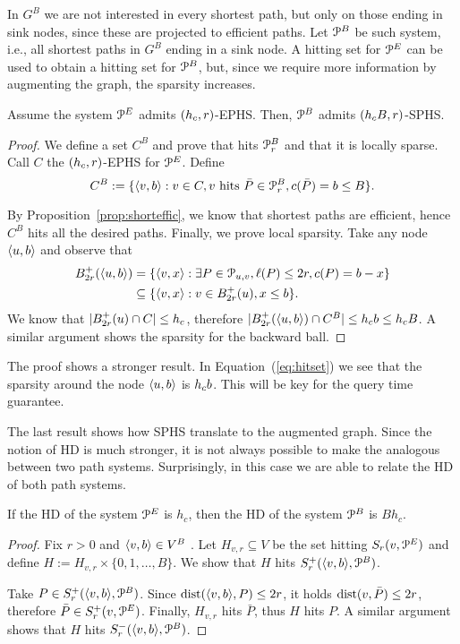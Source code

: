 In $G^B$ we are not interested in every shortest path, but only on those ending in sink nodes, since these are projected to efficient paths. 
Let $\mathcal{P}^B$ be such system, i.e., all shortest paths in $G^B$ ending in a sink node.
A hitting set for $\mathcal{P}^E$ can be used to obtain a hitting set for $\mathcal{P}^B$, but, since we require more information by augmenting the graph, the sparsity increases.
 
\begin{proposition}
Assume the system $\mathcal{P}^E$ admits $(h_c,r)$-EPHS.
Then, $\mathcal{P}^B$ admits $(h_c B,r)$-SPHS.
\end{proposition}
\begin{proof}
We define a set $C^B$ and prove that hits $\mathcal{P}_r^B$ and that it is locally sparse.
Call $C$ the $(h_c,r)$-EPHS for $\mathcal{P}^E$.
Define
\begin{equation}\label{eq:hitset}
C^B:=\{\langle v,b\rangle: v\in C, v \text{ hits }\bar P\in\mathcal{P}_r^B, c(\bar P)=b\leq B \}.
\end{equation}

By Proposition~\ref{prop:shorteffic}, we know that shortest paths are efficient, hence $C^B$ hits all the desired paths.
Finally, we prove local sparsity.
Take any node $\langle u,b\rangle$ and observe that
\begin{align*}
B^+_{2r}(\langle u,b\rangle) &= \{\langle v,x\rangle: \exists P\in\mathcal{P}_{u,v}, \ell(P)\leq 2r, c(P)=b-x\} \\
&\subseteq \{\langle v,x\rangle: v\in B^+_{2r}(u), x\leq b\} .
\end{align*}
We know that $\lvert B^+_{2r}(u)\cap C\rvert\leq h_c$, therefore $\lvert B^+_{2r}(\langle u,b\rangle)\cap C^B\rvert\leq h_c b\leq h_c B$.
A similar argument shows the sparsity for the backward ball.
\end{proof}

\begin{remark}
The proof shows a stronger result.
In Equation~(\ref{eq:hitset}) we see that the sparsity around the node $\langle u,b\rangle$ is $h_c b$.
This will be key for the query time guarantee.
\end{remark}

The last result shows how SPHS translate to the augmented graph.
Since the notion of HD is much stronger, it is not always possible to make the analogous between two path systems.
Surprisingly, in this case we are able to relate the HD of both path systems.

\begin{proposition}\label{prop:HDaugmented}
If the HD of the system $\mathcal{P}^E$ is $h_c$, then the HD of the system $\mathcal{P}^B$ is $Bh_c$.
\end{proposition}
\begin{proof}
Fix $r>0$ and $\langle v,b\rangle\in V^B$ .
Let $H_{v,r}\subseteq V$ be the set hitting $S_r(v,\mathcal{P}^E)$ and define $H:=H_{v,r}\times\{0,1,\ldots,B\}$.
We show that $H$ hits $S^+_r(\langle v,b\rangle,\mathcal{P}^B)$.

Take $P\in S^+_r(\langle v,b\rangle,\mathcal{P}^B)$.
Since $\text{dist}(\langle v,b\rangle,P)\leq 2r$, it holds $\text{dist}(v,\bar P)\leq 2r$, therefore $\bar P\in S^+_r(v,\mathcal{P}^E)$.
Finally, $H_{v,r}$ hits $\bar P$, thus $H$ hits $P$.
A similar argument shows that $H$ hits $S^-_r(\langle v,b\rangle,\mathcal{P}^B)$.
\end{proof}